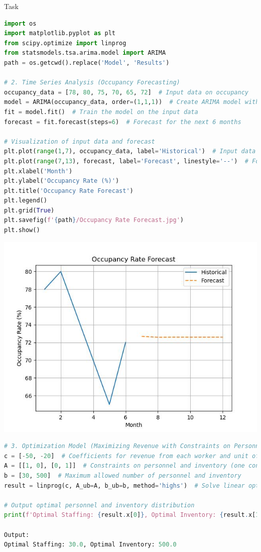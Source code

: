 \documentclass[a4paper,12pt]{article}
\newcommand{\RomanNumeralCaps}[1]{\MakeUppercase{\romannumeral #1}}
\begin{document}
\newpage
    \begin{center}
        \Large{Task \RomanNumeralCaps{3}}
    \end{center}
    \begin{lstlisting}[language=Python]
import os
import matplotlib.pyplot as plt
from scipy.optimize import linprog
from statsmodels.tsa.arima.model import ARIMA
path = os.getcwd().replace('Model', 'Results')

# 2. Time Series Analysis (Occupancy Forecasting)
occupancy_data = [78, 80, 75, 70, 65, 72]  # Input data on occupancy
model = ARIMA(occupancy_data, order=(1,1,1))  # Create ARIMA model with parameters (p=1, d=1, q=1)
fit = model.fit()  # Train the model on the input data
forecast = fit.forecast(steps=6)  # Forecast for the next 6 months

# Visualization of input data and forecast
plt.plot(range(1,7), occupancy_data, label='Historical')  # Input data
plt.plot(range(7,13), forecast, label='Forecast', linestyle='--')  # Forecast
plt.xlabel('Month')
plt.ylabel('Occupancy Rate (%)')
plt.title('Occupancy Rate Forecast')
plt.legend()
plt.grid(True)
plt.savefig(f'{path}/Occupancy Rate Forecast.jpg')
plt.show()
    \end{lstlisting}
    \begin{minipage}[h]{1\linewidth}
        \centering
        \includegraphics[width=0.9\linewidth]{Results/Occupancy Rate Forecast.jpg}  
    \end{minipage}

\newpage
    \begin{lstlisting}[language=Python]
# 3. Optimization Model (Maximizing Revenue with Constraints on Personnel and Inventory)
c = [-50, -20]  # Coefficients for revenue from each worker and unit of inventory (negative for maximization)
A = [[1, 0], [0, 1]]  # Constraints on personnel and inventory (one constraint per variable)
b = [30, 500]  # Maximum allowed number of personnel and inventory
result = linprog(c, A_ub=A, b_ub=b, method='highs')  # Solve linear optimization

# Output optimal personnel and inventory distribution
print(f'Optimal Staffing: {result.x[0]}, Optimal Inventory: {result.x[1]}')

Output:
Optimal Staffing: 30.0, Optimal Inventory: 500.0
    \end{lstlisting}
\end{document}
